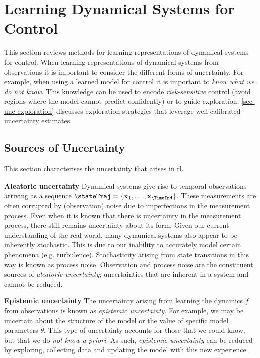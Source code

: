 \documentclass{mimosis-class/mimosis}
\numberwithin{equation}{chapter}
\newcommand{\state}{\ensuremath{\mathbf{x}}}
\begin{document}
\section{Learning Dynamical Systems for Control}
\label{sec:org4642d11}
This section reviews methods for learning representations of dynamical systems for control.
When learning representations of dynamical systems from observations it is important to consider the different
forms of uncertainty.
For example, when using a learned model for control it is important to \emph{know what we do not know}.
This knowledge can be used to encode \emph{risk-sensitive} control (avoid regions where the model cannot predict confidently)
or to guide exploration.
\cref{sec-unc-exploration} discusses exploration strategies that leverage well-calibrated uncertainty estimates.

\subsection{Sources of Uncertainty}
\label{sec:orgb84632a}
This section characterises the uncertainty that arises in \acrshort{rl}.

\textbf{Aleatoric uncertainty}
Dynamical systems give rise to temporal observations arriving as a sequence
\(\stateTraj = \{\state_1, \ldots, \state_\TimeInd\}\).
These measurements are often corrupted by (observation) noise due to imperfections in the measurement process.
Even when it is known that there is uncertainty in the measurement process, there still remains uncertainty about its
form.
Given our current understanding of the real-world, many dynamical systems also appear to be inherently stochastic.
This is due to our inability to accurately model certain phenomena (e.g. turbulence).
Stochasticity arising from state transitions in this way is known as process noise.
Observation and process noise are the constituent sources of \emph{aleatoric uncertainty};
uncertainties that are inherent in a system and cannot be reduced.

\textbf{Epistemic uncertainty}
The uncertainty arising from learning the dynamics \(f\) from observations is known as \emph{epistemic uncertainty}.
For example, we may be uncertain about the structure of the model or the value of specific
model parameters \(\theta\).
This type of uncertainty accounts for those that we could know, but that we do \emph{not know a priori}.
As such, \emph{epistemic uncertainty} can be reduced by exploring, collecting data and updating the model with
this new experience.
\end{document}

